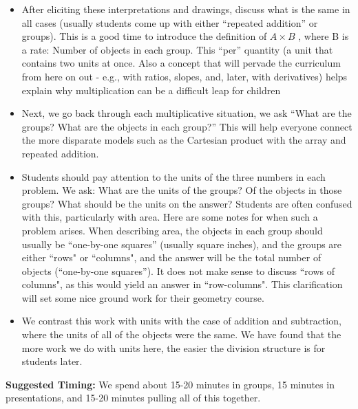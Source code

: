 \documentclass[nooutcomes,noauthor,handout]{ximera}
\begin{document}
\begin{instructorNotes}
\begin{itemize}
	\item After eliciting these interpretations and drawings, discuss what is the same in all cases (usually students come up with either ``repeated addition'' or groups).  This is a good time to introduce the definition of $A\times B$ , where B is a rate:  Number of objects in each group.  This ``per'' quantity (a unit that contains two units at once.  Also a concept that will pervade the curriculum from here on out - e.g., with ratios, slopes, and, later, with derivatives) helps explain why multiplication can be a difficult leap for children
	\item Next, we go back through each multiplicative situation, we ask ``What are the groups? What are the objects in each group?''  This will help everyone connect the more disparate models such as the Cartesian product with the array and repeated addition. 
	\item Students should pay attention to the units of the three numbers in each problem. We ask: What are the units of the groups?  Of the objects in those groups?  What should be the units on the answer?  Students are often confused with this, particularly with area. Here are some notes for when such a problem arises.  When describing area, the objects in each group should usually be ``one-by-one squares'' (usually square inches), and the groups are either ``rows" or ``columns", and the answer will be the total number of objects (``one-by-one squares''). It does not make sense to discuss ``rows of columns", as this would yield an answer in ``row-columns". This clarification will set some nice ground work for their geometry course.
	\item We contrast this work with units with the case of addition and subtraction, where the units of all of the objects were the same.  We have found that the more work we do with units here, the easier the division structure is for students later.
\end{itemize}




{\bf Suggested Timing:} We spend about 15-20 minutes in groups, 15 minutes in presentations, and 15-20 minutes pulling all of this together.
\end{instructorNotes}
\end{document}
